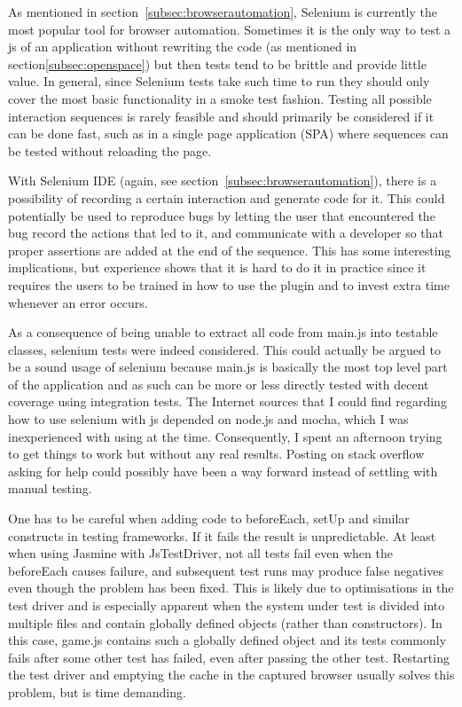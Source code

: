 \documentclass[11pt]{article}
\begin{document}
As mentioned in section~\ref{subsec:browserautomation}, Selenium is currently the most popular tool for browser automation. Sometimes it is the only way to test a \gls{js} of an application without rewriting the code\cite[question~43]{Stenmark} (as mentioned in section\ref{subsec:openspace}) but then tests tend to be brittle and provide little value. In general, since Selenium tests take such time to run they should only cover the most basic functionality in a smoke test fashion. \cite[questions~16-17]{Stenmark}\cite[question~21]{Ahnve} Testing all possible interaction sequences is rarely feasible and should primarily be considered if it can be done fast, such as in a single page application (SPA) where sequences can be tested without reloading the page. \cite[question~44]{Edelstam}

With Selenium IDE (again, see section~\ref{subsec:browserautomation}), there is a possibility of recording a certain interaction and generate code for it. This could potentially be used to reproduce bugs by letting the user that encountered the bug record the actions that led to it, and communicate with a developer so that proper assertions are added at the end of the sequence. This has some interesting implications, but experience shows that it is hard to do it in practice since it requires the users to be trained in how to use the plugin and to invest extra time whenever an error occurs. \cite[questions~42-43]{Edelstam}

As a consequence of being unable to extract all code from main.js into testable classes, selenium tests were indeed considered. This could actually be argued to be a sound usage of selenium because main.js is basically the most top level part of the application and as such can be more or less directly tested with decent coverage using integration tests. The Internet sources that I could find regarding how to use selenium with \gls{js} depended on node.js and mocha, which I was inexperienced with using at the time. Consequently, I spent an afternoon trying to get things to work but without any real results. Posting on stack overflow asking for help could possibly have been a way forward instead of settling with manual testing.

One has to be careful when adding code to beforeEach, setUp and similar constructs in testing frameworks. If it fails the result is unpredictable. At least when using Jasmine with JsTestDriver, not all tests fail even when the beforeEach causes failure, and subsequent test runs may produce false negatives even though the problem has been fixed. This is likely due to optimisations in the test driver and is especially apparent when the system under test is divided into multiple files and contain globally defined objects (rather than constructors). In this case, game.js contains such a globally defined object and its tests commonly fails after some other test has failed, even after passing the other test. Restarting the test driver and emptying the cache in the captured browser usually solves this problem, but is time demanding.
\end{document}
